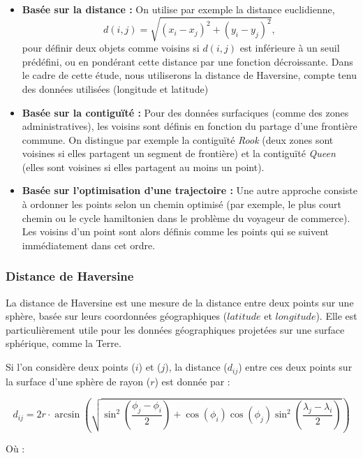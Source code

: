 \documentclass[
]{article}
\begin{document}
\begin{itemize}
  \item \textbf{Basée sur la distance :}  
  On utilise par exemple la distance euclidienne,
  $$
  d(i,j) = \sqrt{(x_i - x_j)^2 + (y_i - y_j)^2},
  $$
pour définir deux objets comme voisins si \(d(i,j)\) est inférieure à un seuil prédéfini, ou en pondérant cette distance par une fonction décroissante. Dans le cadre de cette étude, nous utiliserons la distance de Haversine, compte tenu des données utilisées (longitude et latitude)

\item \textbf{Basée sur la contiguïté :}  
  Pour des données surfaciques (comme des zones administratives), les voisins sont définis en fonction du partage d'une frontière commune. On distingue par exemple la contiguïté \emph{Rook} (deux zones sont voisines si elles partagent un segment de frontière) et la contiguïté \emph{Queen} (elles sont voisines si elles partagent au moins un point).
  
  \item \textbf{Basée sur l'optimisation d'une trajectoire :}  
  Une autre approche consiste à ordonner les points selon un chemin optimisé (par exemple, le plus court chemin ou le cycle hamiltonien dans le problème du voyageur de commerce). Les voisins d'un point sont alors définis comme les points qui se suivent immédiatement dans cet ordre.
\end{itemize}

\hypertarget{distance-de-haversine}{%
\subsubsection{Distance de Haversine}\label{distance-de-haversine}}

La distance de Haversine est une mesure de la distance entre deux points
sur une sphère, basée sur leurs coordonnées géographiques (\(latitude\)
et \(longitude\)). Elle est particulièrement utile pour les données
géographiques projetées sur une surface sphérique, comme la Terre.

Si l'on considère deux points (\(i\)) et (\(j\)), la distance
(\(d_{ij}\)) entre ces deux points sur la surface d'une sphère de rayon
(\(r\)) est donnée par :

\[
 d_{ij} = 2r \cdot \arcsin\left(\sqrt{\sin^2\left(\frac{\phi_j - \phi_i}{2}\right) + \cos(\phi_i)\cos(\phi_j)\sin^2\left(\frac{\lambda_j - \lambda_i}{2}\right)}\right)
\]

Où :
\end{document}
